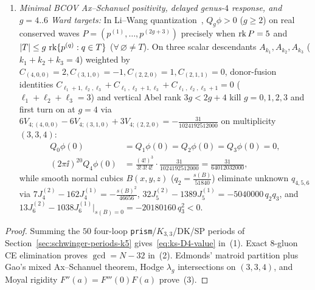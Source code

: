 \begin{theorem}[Four-loop Kodaira--Spencer $D_4$, Type~I $\SO(32)$, $\mathrm{WZW}_4$, and delayed $g=4$ BCOV~{\cite{CL19,LW26,Repo9e833c8}}]
\begin{enumerate}[label=(\arabic*),leftmargin=*]
  \item \emph{Minimal BCOV Ax--Schanuel positivity, delayed genus-$4$ response, and $g=4..6$ Ward targets:} In Li--Wang quantization~\cite{LW26}, $Q_g\phi > 0$ ($g \ge 2$) on real conserved waves $P = (p^{(1)},\dots,p^{(2g+3)})$ precisely when $\operatorname{rk} P = 5$ and $|T| \le g\,\operatorname{rk}\{p^{(q)} : q \in T\}$ ($\forall\,\varnothing\neq T$). On three scalar descendants $A_{k_1}, A_{k_2}, A_{k_3}$ ($k_1+k_2+k_3=4$) weighted by $C_{(4,0,0)}=2, C_{(3,1,0)}=-1, C_{(2,2,0)}=1, C_{(2,1,1)}=0$, donor-fusion identities $C_{\ell_1+1,\ell_2,\ell_3}+C_{\ell_1,\ell_2+1,\ell_3}+C_{\ell_1,\ell_2,\ell_3+1}=0$ ($\ell_1+\ell_2+\ell_3=3$) and vertical Abel rank $3g < 2g+4$ kill $g=0,1,2,3$ and first turn on at $g = 4$ via $6V_{4;(4,0,0)}-6V_{4;(3,1,0)}+3V_{4;(2,2,0)} = -\frac{31}{1024192512000}$ on multiplicity $(3,3,4)$:
  \begin{equation}
  \label{eq:delayed-g4-bcov}
  \begin{aligned}
  Q_0\phi(0) &= Q_1\phi(0) = Q_2\phi(0) = Q_3\phi(0) = 0,\\
  (2\pi\ii)^{20}Q_4\phi(0) &= \frac{(4!)^3}{3!\,3!\,4!}\cdot\frac{31}{1024192512000} = \frac{31}{64012032000},
  \end{aligned}
  \end{equation}
  while smooth normal cubics $B(x,y,z)$ ($q_2 = \frac{s(B)}{51840}$) eliminate unknown $q_{4,5,6}$ via $7J_4^{(2)} - 162J_4^{(1)} = -\frac{s(B)^2}{46656}$, $32J_5^{(2)} - 1389J_5^{(1)} = -5040000\,q_2 q_3$, and $13J_6^{(2)} - 1038J_6^{(1)}|_{s(B)=0} = -20180160\,q_3^2 < 0$.
\end{enumerate}
\end{theorem}

\begin{proof}
Summing the $50$ four-loop \texttt{prism}/$K_{3,3}$/DK/SP periods of Section~\ref{sec:schwinger-periods-k5} gives~\eqref{eq:ks-D4-value} in~(1). Exact $8$-gluon CE elimination proves $\gcd = N-32$ in~(2). Edmonds' matroid partition plus Gao's mixed Ax--Schanuel theorem, Hodge $\lambda_g$ intersections on $(3,3,4)$, and Moyal rigidity $F''(a) = F'''(0)F(a)$ prove~(3).
\end{proof}

